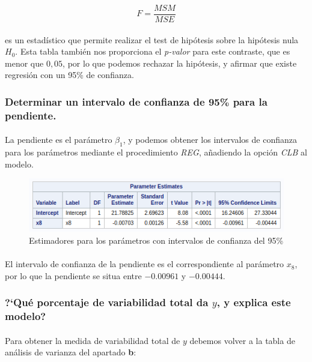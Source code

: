 \documentclass{article}
\begin{document}
  \begin{equation}
    F = \frac{MSM}{MSE}
  \end{equation}

  \paragraph{}
  es un estadístico que permite realizar el test de hipótesis sobre la hipótesis nula $H_0$. Esta tabla también nos proporciona el \textit{p-valor} para este contraste, que es menor que $0,05$, por lo que podemos rechazar la hipótesis, y afirmar que existe regresión con un 95\% de confianza.

  \subsubsection{Determinar un intervalo de confianza de 95\% para la pendiente.}

  \paragraph{}
  La pendiente es el parámetro $\beta_1$, y podemos obtener los intervalos de confianza para los parámetros mediante el procedimiento \textit{REG}, añadiendo la opción \textit{CLB} al modelo.

  \begin{figure}[H]
    \centering
    \includegraphics[width=.6\linewidth]{img/montgomery/icestim.png}
    \caption{Estimadores para los parámetros con intervalos de confianza del 95\%}
  \end{figure}

  \paragraph{}
  El intervalo de confianza de la pendiente es el correspondiente al parámetro $x_8$, por lo que la pendiente se situa entre $-0.00961$ y $-0.00444$.

  \subsubsection{?`Qué porcentaje de variabilidad total da $y$, y explica este modelo?}

  \paragraph{}
  Para obtener la medida de variabilidad total de $y$ debemos volver a la tabla de análisis de varianza del apartado \textbf{b}:
\end{document}
